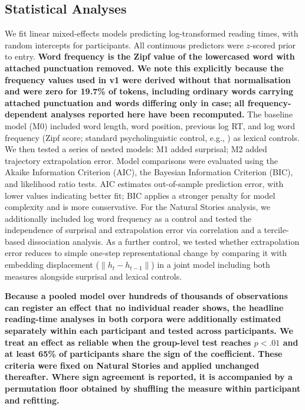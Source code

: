 \documentclass[12pt]{article}
\newcommand{\new}[1]{{\bfseries #1}}
\begin{document}
\subsection{Statistical Analyses}

We fit linear mixed-effects models predicting log-transformed reading times, with random intercepts for participants. All continuous predictors were $z$-scored prior to entry. \new{Word frequency is the Zipf value of the lowercased word with attached punctuation removed. We note this explicitly because the frequency values used in v1 were derived without that normalisation and were zero for 19.7\% of tokens, including ordinary words carrying attached punctuation and words differing only in case; all frequency-dependent analyses reported here have been recomputed.} The baseline model (M0) included word length, word position, previous log RT, and log word frequency (Zipf score; standard psycholinguistic control, e.g., \citealp{smith2013}) as lexical controls. We then tested a series of nested models: M1 added surprisal; M2 added trajectory extrapolation error. Model comparisons were evaluated using the Akaike Information Criterion (AIC), the Bayesian Information Criterion (BIC), and likelihood ratio tests. AIC estimates out-of-sample prediction error, with lower values indicating better fit; BIC applies a stronger penalty for model complexity and is more conservative. For the Natural Stories analysis, we additionally included log word frequency as a control and tested the independence of surprisal and extrapolation error via correlation and a tercile-based dissociation analysis. As a further control, we tested whether extrapolation error reduces to simple one-step representational change by comparing it with embedding displacement ($\|h_t - h_{t-1}\|$) in a joint model including both measures alongside surprisal and lexical controls.

\new{Because a pooled model over hundreds of thousands of observations can register an effect that no individual reader shows, the headline reading-time analyses in both corpora were additionally estimated separately within each participant and tested across participants. We treat an effect as reliable when the group-level test reaches $p < .01$ and at least 65\% of participants share the sign of the coefficient. These criteria were fixed on Natural Stories and applied unchanged thereafter. Where sign agreement is reported, it is accompanied by a permutation floor obtained by shuffling the measure within participant and refitting.}
\end{document}
